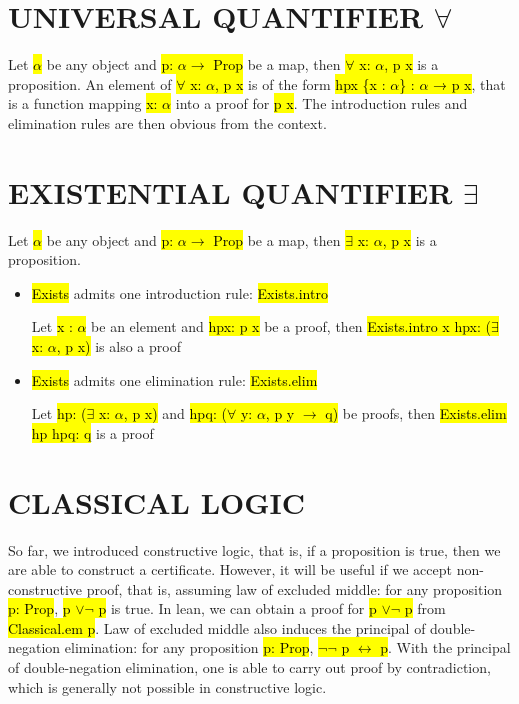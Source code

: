 \section{UNIVERSAL QUANTIFIER $\forall$}

Let \hl{$\alpha$} be any object and \hl{p: $\alpha \to$ Prop} be a map, then \hl{$\forall$ x: $\alpha$, p x} is a proposition. An element of \hl{$\forall$ x: $\alpha$, p x} is of the form \hl{hpx \{x : $\alpha$\} : $\alpha$ → p x}, that is a function mapping \hl{x: $\alpha$} into a proof for \hl{p x}. The introduction rules and elimination rules are then obvious from the context.

\section{EXISTENTIAL QUANTIFIER $\exists$}

Let \hl{$\alpha$} be any object and \hl{p: $\alpha \to$ Prop} be a map, then \hl{$\exists$ x: $\alpha$, p x} is a proposition.

\begin{itemize}
	\item \hl{Exists} admits one introduction rule: \hl{Exists.intro}
	
	Let \hl{x : $\alpha$} be an element and \hl{hpx: p x} be a proof, then \hl{Exists.intro x hpx: ($\exists$ x: $\alpha$, p x)} is also a proof
	
	\item \hl{Exists} admits one elimination rule: \hl{Exists.elim}
	
	Let \hl{hp: ($\exists$ x: $\alpha$, p x)} and \hl{hpq: ($\forall$ y: $\alpha$, p y $\to$ q)} be proofs, then \hl{Exists.elim hp hpq: q} is a proof 
\end{itemize}

\section{CLASSICAL LOGIC}

So far, we introduced constructive logic, that is, if a proposition is true, then we are able to construct a certificate. However, it will be useful if we accept non-constructive proof, that is, assuming law of excluded middle: for any proposition \hl{p: Prop}, \hl{p $\lor \lnot$ p} is true. In lean, we can obtain a proof for \hl{p $\lor \lnot$ p} from \hl{Classical.em p}. Law of excluded middle also induces the principal of double-negation elimination: for any proposition \hl{p: Prop}, \hl{$\lnot \lnot$ p $\leftrightarrow$ p}. With the principal of double-negation elimination, one is able to carry out proof by contradiction, which is generally not possible in constructive logic. 

